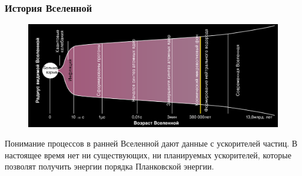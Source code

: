 \documentclass[dvipsnames] {beamer}
\begin{document}
\begin{frame}
  \bf
  \frametitle{\bf \centering История Вселенной}
   \begin{figure}[H]
     \includegraphics[width=1.\linewidth]{History_of_the_Universe-ru.png}
   \end{figure}
   \begin{block}{}
     \color{red} Понимание процессов в ранней Вселенной дают данные с ускорителей частиц.
     \color{blue} В настоящее время нет ни существующих, ни планируемых ускорителей, которые позволят получить энергии порядка Планковской энергии.
   \end{block}
\end{frame}

\begin{frame}
  
\end{frame}
\end{document}
